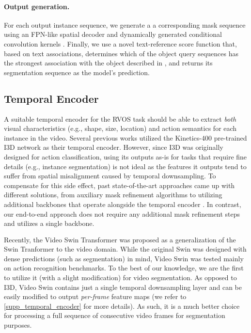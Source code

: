 \documentclass[10pt,twocolumn,letterpaper]{article}
\renewcommand{\cite}[1]{\citep{#1}}
\begin{document}
\paragraph{Output generation.}
For each output instance sequence,  we generate a a corresponding mask sequence using an FPN-like \cite{lin2017fpn} spatial decoder and dynamically generated conditional convolution kernels \cite{tian2020conditional,wang2021maxdeeplab}. Finally, we use a novel text-reference score function that, based on text associations, determines which of the object query sequences has the strongest association with the object described in , and returns its segmentation sequence as the model's prediction.

\subsection{Temporal Encoder} \label{subsec:backbone}
A suitable temporal encoder for the RVOS task should be able to extract \textit{both} visual characteristics (e.g., shape, size, location) and action semantics for each instance in the video. Several previous works \cite{gavrilyuk2018a2d,ning2020polar,liu2021cmpc} utilized the Kinetics-400 \cite{kay2017kinetics} pre-trained I3D network \cite{carreira2017i3d} as their temporal encoder. However, since I3D was originally designed for action classification, using its outputs as-is for tasks that require fine details (e.g., instance segmentation) is not ideal as the features it outputs tend to suffer from spatial misalignment caused by temporal downsampling. To compensate for this side effect, past state-of-the-art approaches came up with different solutions, from auxiliary mask refinement algorithms \cite{krahenbuhl2012crf, liu2021cmpc} to utilizing additional backbones that operate alongside the temporal encoder \cite{hui2021cstm}. In contrast, our end-to-end approach does not require any additional mask refinement steps and utilizes a single backbone.

Recently, the Video Swin Transformer \cite{liu2021vswin} was proposed as a generalization of the Swin Tranformer \cite{liu2021swin} to the video domain. While the original Swin was designed with dense predictions (such as segmentation) in mind, Video Swin was tested mainly on action recognition benchmarks. To the best of our knowledge, we are the first to utilize it (with a slight modification) for video segmentation.
As opposed to I3D, Video Swin contains just a single temporal downsampling layer and can be easily modified to output \textit{per-frame} feature maps (we refer to \cref{supp_temporal_encoder} for more details). As such, it is a much better choice for processing a full sequence of consecutive video frames for segmentation purposes.
\end{document}

